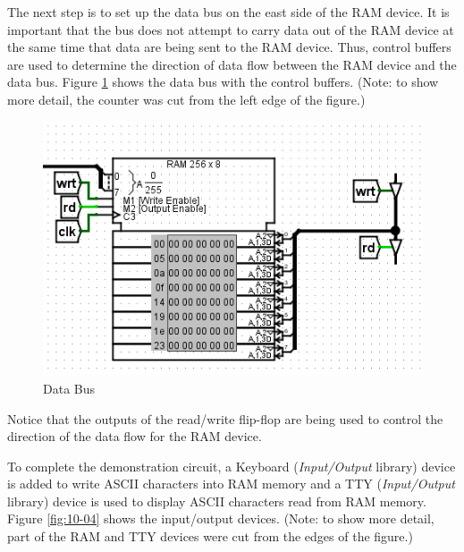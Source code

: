 The next step is to set up the data bus on the east side of the RAM device. It is important that the bus does not attempt to carry data out of the RAM device at the same time that data are being sent to the RAM device. Thus, control buffers are used to determine the direction of data flow between the RAM device and the data bus. Figure \ref{fig:10-03} shows the data bus with the control buffers. (Note: to show more detail, the counter was cut from the left edge of the figure.)

\begin{figure}[H]
	\centering
	\includegraphics[width=\maxwidth{.95\linewidth}]{gfx/10-03}
	\caption{Data Bus}
	\label{fig:10-03}
\end{figure}

Notice that the outputs of the read/write flip-flop are being used to control the direction of the data flow for the RAM device.

To complete the demonstration circuit, a Keyboard (\textit{Input/Output} library) device is added to write ASCII characters into RAM memory and a TTY (\textit{Input/Output} library) device is used to display ASCII characters read from RAM memory. Figure \ref{fig:10-04} shows the input/output devices. (Note: to show more detail, part of the RAM and TTY devices were cut from the edges of the figure.)

